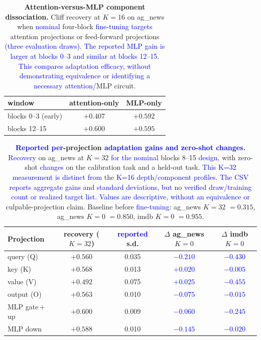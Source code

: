 \documentclass[11pt]{article}
\begin{document}
\begin{table}[h]
\centering
\caption{\textbf{Attention-versus-MLP component dissociation.} Cliff recovery at $K{=}16$
on ag\_news when \textcolor{blue}{nominal} four-block \textcolor{blue}{fine-tuning targets} attention projections or feed-forward
projections (\textcolor{blue}{three evaluation draws). The reported MLP gain is larger at blocks 0--}3 \textcolor{blue}{and
similar at blocks 12--15. This compares adaptation efficacy, without demonstrating
equivalence or identifying a necessary attention/}MLP circuit\textcolor{blue}{.}}
\label{stab:component}
\footnotesize
\begin{tabular}{lcc}
\toprule
window & attention-only & MLP-only \\
\midrule
blocks 0--3 (early)  & $+0.407$ & $+0.592$ \\
blocks 12--15        & $+0.600$ & $+0.595$ \\
\bottomrule
\end{tabular}
\end{table}

\begin{table}[h]
\centering
\caption{\textbf{\textcolor{blue}{Reported per}-projection \textcolor{blue}{adaptation gains and zero-shot changes.}}
\textcolor{blue}{Recovery} on ag\_news at $K{=}32$ \textcolor{blue}{for the nominal} blocks 8--15 \textcolor{blue}{design}, with zero-shot \textcolor{blue}{changes}
on the calibration task and a held-out task. \textcolor{blue}{This K=32 measurement is distinct from} the
\textcolor{blue}{K=16 depth/component profiles. The CSV reports aggregate gains and standard deviations,
but} no \textcolor{blue}{verified draw/training count or realized target list. Values are descriptive,
without an equivalence or} culpable\textcolor{blue}{-}projection claim. Baseline before \textcolor{blue}{fine-tuning}:
ag\_news $K{=}32$ $=0.315$, ag\_news $K{=}0$ $=0.850$, imdb $K{=}0$ $=0.955$.}
\label{stab:projection}
\footnotesize
\begin{tabular}{lcccc}
\toprule
Projection & recovery ($K{=}32$) & \textcolor{blue}{reported} s.d. & $\Delta$ ag\_news $K{=}0$ & $\Delta$ imdb $K{=}0$ \\
\midrule
query (Q)        & $+0.560$ & 0.035 & \textcolor{blue}{$-0.210$} & \textcolor{blue}{$-0.430$} \\
key (K)          & $+0.568$ & 0.013 & \textcolor{blue}{$+0.020$} & \textcolor{blue}{$-0.005$} \\
value (V)        & $+0.492$ & 0.075 & \textcolor{blue}{$+0.025$} & \textcolor{blue}{$-0.455$} \\
output (O)       & $+0.563$ & 0.010 & \textcolor{blue}{$-0.075$} & \textcolor{blue}{$-0.015$} \\
MLP gate\,$+$\,up & $+0.600$ & 0.009 & \textcolor{blue}{$-0.060$} & \textcolor{blue}{$-0.245$} \\
MLP down         & $+0.588$ & 0.010 & \textcolor{blue}{$-0.145$} & \textcolor{blue}{$-0.020$} \\
\bottomrule
\end{tabular}
\end{table}
\end{document}
